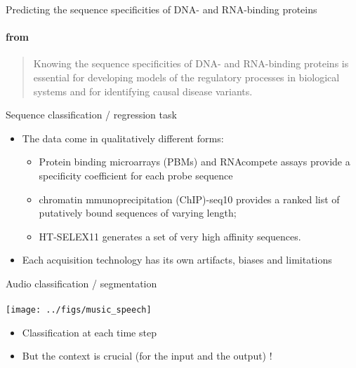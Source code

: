 \begin{frame}{Predicting the sequence specificities of DNA- and RNA-binding proteins}
  \framesubtitle{from \cite{Alipanahi15DNABinding}}
    \begin{quote}
      \small Knowing the sequence specificities of DNA- and
      RNA-binding proteins is essential for developing models of the
      regulatory processes in biological systems and for identifying
      causal disease variants.
  \end{quote}
  \begin{block}{Sequence classification / regression task}
    \begin{center}
    \end{center}
    \begin{itemize}
    \item The data come in qualitatively different forms:
      \begin{itemize}
      \item Protein binding microarrays (PBMs) and RNAcompete assays
        provide a specificity coefficient for each probe sequence
      \item chromatin mmunoprecipitation (ChIP)-seq10 provides a
        ranked list of putatively bound sequences of varying length;
      \item HT-SELEX11 generates a set of very high affinity
        sequences.
    \end{itemize}
    \item Each  acquisition technology has its own artifacts, biases and limitations
    \end{itemize}
  \end{block}
\end{frame}



\begin{frame}{Audio classification / segmentation}
  \framesubtitle{\cite{Jang19Music}}
  \begin{center}
    \texttt{[image: ../figs/music\_speech]}    
  \end{center}
  \begin{itemize}
  \item Classification at each time step
  \item But the context is crucial (for the input and the output) ! 
  \end{itemize}
\end{frame}



